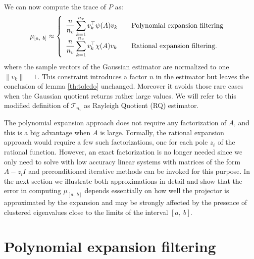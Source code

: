 \documentclass[12pt]{article}		\usepackage{tabls,multirow}
\def\TT{\mathcal{T}}
\newcommand{\ab}{[a, \ b]}
\begin{document}
We can now compute the trace of $P$ as:
\begin{eqnarray}
\label{eq:expan}
\mu_{\ab} \approx \left\{
  \begin{array}{l l}
    \displaystyle {n \over n_v}  \sum_{k=1}^{n_v} v_k^\top \psi(A) v_k & \quad \textrm{Polynomial expansion filtering}\\
    \displaystyle {n \over n_v}  \sum_{k=1}^{n_v} v_k^\top \chi(A) v_k & \quad \textrm{Rational expansion filtering}.
  \end{array}
\right.
\end{eqnarray}
where the sample vectors of the Gaussian estimator are normalized to
one $\|v_k\|=1$. This constraint introduces a factor $n$ in the
estimator but leaves the conclusion of lemma \ref{th:toledo}
unchanged. Moreover it avoids those rare cases when the Gaussian
quotient returns rather large values. We will refer to this modified
definition of $\TT_{n_v}$ as Rayleigh Quotient (RQ) estimator.

The polynomial expansion approach does not require any factorization
of $A$, and this is a big advantage when $A$ is large. Formally, the
rational expansion approach would require a few such factorizations,
one for each pole $z_i$ of the rational function. However, an exact
factorization is no longer needed since we only need to solve with low
accuracy linear systems with matrices of the form $A -z_i I$ and
preconditioned iterative methods can be invoked for this purpose.  In
the next section we illustrate both approximations in detail and show
that the error in computing $\mu_{\ab}$ depends essentially on how
well the projector is approximated by the expansion and may be
strongly affected by the presence of clustered eigenvalues close to
the limits of the interval $\ab$.




\section{Polynomial expansion filtering} 
\label{sec:polynomial}
\end{document}
